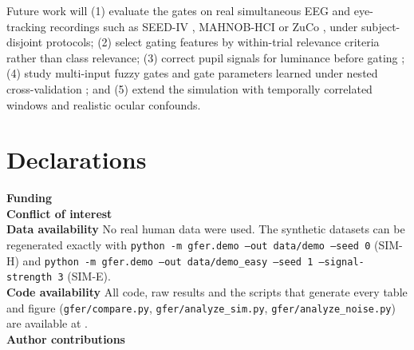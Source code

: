 Future work will (1) evaluate the gates on real simultaneous EEG and eye-tracking recordings such as SEED-IV \cite{Zheng2019}, MAHNOB-HCI \cite{Soleymani2012db} or ZuCo \cite{Hollenstein2018}, under subject-disjoint protocols; (2) select gating features by within-trial relevance criteria rather than class relevance; (3) correct pupil signals for luminance before gating \cite{Raiturkar2016}; (4) study multi-input fuzzy gates and gate parameters learned under nested cross-validation \cite{Jang1993}; and (5) extend the simulation with temporally correlated windows and realistic ocular confounds.

\section*{Declarations}
\noindent\textbf{Funding} \\
\textbf{Conflict of interest} \\
\textbf{Data availability} No real human data were used. The synthetic datasets can be regenerated exactly with \texttt{python -m gfer.demo --out data/demo --seed 0} (SIM-H) and \texttt{python -m gfer.demo --out data/demo\_easy --seed 1 --signal-strength 3} (SIM-E).\\
\textbf{Code availability} All code, raw results and the scripts that generate every table and figure (\texttt{gfer/compare.py}, \texttt{gfer/analyze\_sim.py}, \texttt{gfer/analyze\_noise.py}) are available at .\\
\textbf{Author contributions} 

\small
